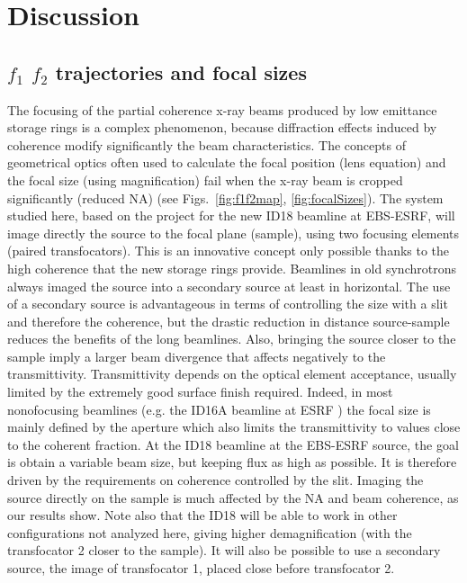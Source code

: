 \documentclass{iucr}              %
\begin{document}
\newpage


\section{Discussion}
\label{sec:discussion}


\subsection{$f_1$ $f_2$ trajectories and focal sizes} 

The focusing of the partial coherence x-ray beams produced by low emittance storage rings is a complex phenomenon, because diffraction effects induced by coherence modify significantly the  beam characteristics. The concepts of geometrical optics often used to calculate the focal position (lens equation) and the focal size (using magnification) fail when the x-ray beam is cropped significantly (reduced NA) (see Figs.~\ref{fig:f1f2map}, \ref{fig:focalSizes}).
The system studied here, based on the project for the new ID18 beamline at EBS-ESRF, will image directly the source to the focal plane (sample), using two focusing elements (paired transfocators). This is an innovative concept only possible thanks to the high coherence that the new storage rings provide. Beamlines in old synchrotrons always imaged the source into a secondary source at least in horizontal. The use of a secondary source is advantageous in terms of controlling the size with a slit and therefore the coherence, but the drastic reduction in distance source-sample reduces the benefits of the long beamlines. Also, bringing the source closer to the sample imply a larger beam divergence that affects negatively to the transmittivity. Transmittivity depends on the optical element acceptance, usually limited by the extremely good surface finish required. Indeed, in most nonofocusing beamlines (e.g. the ID16A beamline at ESRF \cite{ID16A, hierarchical}) the focal size is mainly defined by  the aperture which also limits the transmittivity to values close to the coherent fraction. At the ID18 beamline at the EBS-ESRF source, the goal is obtain a variable beam size, but keeping flux as high as possible. It is therefore driven by the requirements on coherence controlled by the slit. Imaging the source directly on the sample is much affected by the NA and beam coherence, as our results show. Note also that the ID18 will be able to work in other configurations not analyzed here, giving higher demagnification (with the transfocator 2 closer to the sample). It will also be possible to use a secondary source, the image of transfocator 1, placed close before transfocator 2.
\end{document}
